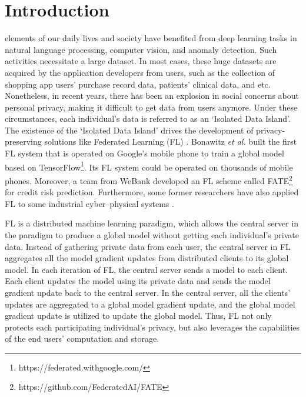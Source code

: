 \documentclass[journal]{IEEEtran}
\begin{document}
\section{Introduction}
 elements of our daily lives and society have benefited from deep learning tasks in natural language processing, computer vision, and anomaly detection. Such activities necessitate a large dataset. In most cases, these huge datasets are acquired by the application developers from users, such as the collection of shopping app users' purchase record data, patients' clinical data, and etc. Nonetheless, in recent years, there has been an explosion in social concerns about personal privacy, making it difficult to get data from users anymore. Under these circumstances, each individual's data is referred to as an `Isolated Data Island'. The existence of the `Isolated Data Island' drives the development of privacy-preserving solutions like Federated Learning (FL) \cite{ref_01_GoogleFL,ref_02_FLConcept,li2021a}. Bonawitz \textit{et al.} built the first FL system that is operated on Google's mobile phone to train a global model based on TensorFlow\footnote{https://federated.withgoogle.com/}. Its FL system could be operated on thousands of mobile phones. Moreover, a team from WeBank developed an FL scheme called FATE\footnote{https://github.com/FederatedAI/FATE} for credit risk prediction. Furthermore, some former researchers have also applied FL to some industrial cyber–physical systems \cite{ref_42_FLApp, ref_43_FLApp, hao2020hao}.

\par FL is a distributed machine learning paradigm, which allows the central server in the paradigm to produce a global model without getting each individual's private data. Instead of gathering private data from each user, the central server in FL aggregates all the model gradient updates from distributed clients to its global model. In each iteration of FL, the central server sends a model to each client. Each client updates the model using its private data and sends the model gradient update back to the central server. In the central server, all the clients' updates are aggregated to a global model gradient update, and the global model gradient update is utilized to update the global model. Thus, FL not only protects each participating individual's privacy, but also leverages the capabilities of the end users' computation and storage.
\end{document}
